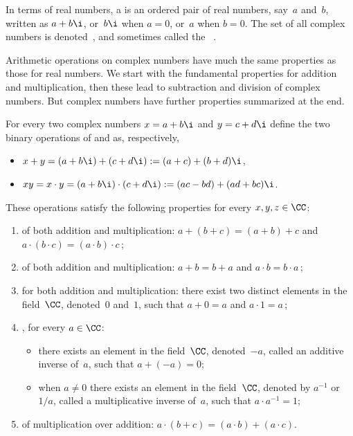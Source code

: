 \begin{draft}
\begin{definition}\label{def:cc}
In terms of real numbers, a  is an ordered pair of real numbers, say~\(a\) and~\(b\), written as \(a+b\i\), or~\(b\i\) when \(a=0\), or~\(a\) when \(b=0\).
The set of all complex numbers is denoted~\CC, and sometimes called the ~\CC.
\end{definition}

Arithmetic operations on complex numbers have much the same properties as those for real numbers.
We start with the fundamental properties for addition and multiplication, then these lead to subtraction and division of complex numbers.
But complex numbers have further properties summarized at the end.


\begin{theorem} \label{def:ccfield}
For every two complex numbers \(x=a+b\i\) and \(y=c+d\i\) define 
the two binary operations of  and  
as, respectively,
\begin{itemize}
\item \(x+y=(a+b\i)+(c+d\i):=(a+c)+(b+d)\i\),
\item \(xy=x\cdot y=(a+b\i)\cdot(c+d\i):=(ac-bd)+(ad+bc)\i\).
\end{itemize}
These operations satisfy the following properties for every  \(x,y,z\in \CC\):
\begin{enumerate}
\item {} of both addition and multiplication: \(a + (b + c) = (a + b) + c\) and \(a \cdot (b \cdot c) = (a \cdot b) \cdot c\)\,;
\item {} of both addition and multiplication: \(a + b = b + a\) and \(a \cdot b = b \cdot a\)\,;
\item {} for both addition and multiplication: there exist two distinct elements in the field~\(\CC\), denoted~\(0\) and~\(1\), such that \(a + 0 = a\) and \(a \cdot 1 = a\)\,;
\item {}, for every \(a\in \CC\): 
\begin{itemize}
\item there exists an element in the field~\(\CC\), denoted~\(-a\), called an additive inverse of~\(a\), such that \(a + (-a) = 0\);
\item when \(a\neq 0\) there exists an element in the field~\(\CC\), denoted by \(a^{-1}\) or~\(1/a\), called a multiplicative inverse of~\(a\), such that \(a \cdot a^{-1} = 1\);
\end{itemize}
\item {} of multiplication over addition: \(a \cdot (b + c) = (a \cdot b) + (a \cdot c)\).
\end{enumerate}
\end{theorem}





\end{draft}
